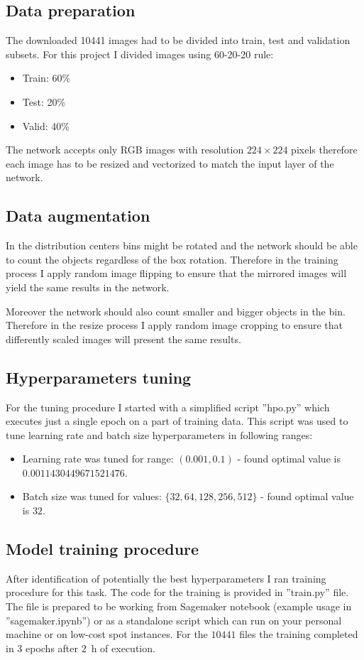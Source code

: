 \documentclass{article}
\begin{document}
\subsection{Data preparation}
The downloaded 10441 images had to be divided into train, test and validation subsets. For this project I divided images using 60-20-20 rule:
\begin{itemize}
	\item Train: 60\%
	\item Test: 20\%
	\item Valid: 40\%
\end{itemize}

The network accepts only RGB images with resolution $224\times224$ pixels therefore each image has to be resized and vectorized to match the input layer of the network.

\subsection{Data augmentation}
In the distribution centers bins might be rotated and the network should be able to count the objects regardless of the box rotation. Therefore in the training process I apply random image flipping to ensure that the mirrored images will yield the same results in the network. 

Moreover the network should also count smaller and bigger objects in the bin. Therefore in the resize process I apply random image cropping to ensure that differently scaled images will present the same results.

\subsection{Hyperparameters tuning}
For the tuning procedure I started with a simplified script ''hpo.py'' which executes just a single epoch on a part of training data. This script was used to tune learning rate and batch size hyperparameters in following ranges:
\begin{itemize}
\item Learning rate was tuned for range: $(0.001, 0.1)$ - found optimal value is $0.0011430449671521476$.
\item Batch size was tuned for values: $\{32, 64, 128, 256, 512\}$ - found optimal value is $32$.
\end{itemize}

\subsection{Model training procedure}
After identification of potentially the best hyperparameters I ran training procedure for this task. The code for the training is provided in ''train.py'' file. The file is prepared to be working from Sagemaker notebook (example usage in ''sagemaker.ipynb'') or as a standalone script which can run on your personal machine or on low-cost spot instances. For the $10441$ files the training completed in $3$ epochs after $2$~h of execution.
\end{document}
